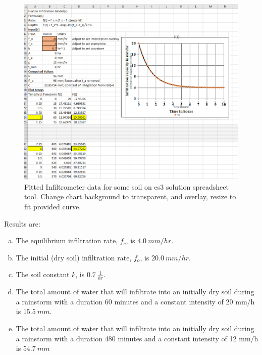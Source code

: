 \documentclass[12pt]{article}
\begin{document}
\begin{enumerate}
\begin{figure}[h!] %
   \centering
   \includegraphics[width=5in]{pr4_xls_one.png} 
   \caption{Fitted Infiltrometer data for some soil on es3 solution spreadsheet tool.  Change chart background to transparent, and overlay, resize to fit provided curve.}
   \label{fig:pr4_xls_one}
\end{figure}

Results are:

    \begin{enumerate}[a)]
        \item The equilibrium infiltration rate, $f_c$, is $4.0~mm/hr$.
        \item The initial (dry soil) infiltration rate, $f_o$, is $20.0~mm/hr$.
        \item The soil constant $k$, is $0.7~\frac{1}{hr}$.
        \item The total amount of water that will infiltrate into an initially dry soil during a rainstorm with a duration 60 minutes and a constant intensity of 20 mm/h is $15.5~mm$.
        \item The total amount of water that will infiltrate into an initially dry soil during a rainstorm with a duration 480 minutes and a constant intensity of 12 mm/h is $54.7~mm$
    \end{enumerate}

\end{enumerate}
\end{document}
